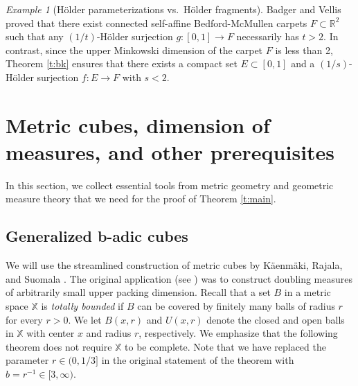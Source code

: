 \documentclass[12pt]{amsart}
\theoremstyle{definition}
\theoremstyle{remark}
\newtheorem{example}[theorem]{Example}
\newcommand{\RR}{\mathbb{R}}
\newcommand{\XX}{\mathbb{X}}
\numberwithin{figure}{section}
\numberwithin{equation}{section}
\begin{document}
\begin{example}[H\"older parameterizations vs.~H\"older fragments] Badger and Vellis \cite{BV-IFS} proved that there exist connected self-affine Bedford-McMullen carpets $F\subset\RR^2$ such that any $(1/t)$-H\"older surjection $g:[0,1]\rightarrow F$ necessarily has $t>2$. In contrast, since the upper Minkowski dimension of the carpet $F$ is less than 2, Theorem \ref{t:bk} ensures that there exists a compact set $E\subset[0,1]$ and a $(1/s)$-H\"older surjection $f:E\rightarrow F$ with $s<2$.
\end{example}

\section{Metric cubes, dimension of measures, and other prerequisites}\label{s:background}

In this section, we collect essential tools from metric geometry and geometric measure theory that we need for the proof of Theorem \ref{t:main}.

\subsection{Generalized b-adic cubes} \label{ss:cubes}

We will use the streamlined construction of metric cubes by K\"aenm\"aki, Rajala, and Suomala \cite{KRS-cubes}. The original application (see \cite[Theorem 4.1]{KRS-cubes}) was to construct doubling measures of arbitrarily small upper packing dimension.  Recall that a set $B$ in a metric space $\XX$ is \emph{totally bounded} if $B$ can be covered by finitely many balls of radius $r$ for every $r>0$. We let $B(x,r)$ and $U(x,r)$ denote the closed and open balls in $\XX$ with center $x$ and radius $r$, respectively. We emphasize that the following theorem does not require $\XX$ to be complete. Note that we have replaced the parameter $r\in(0,1/3]$ in the original statement of the theorem with $b=r^{-1}\in[3,\infty)$.
\end{document}
